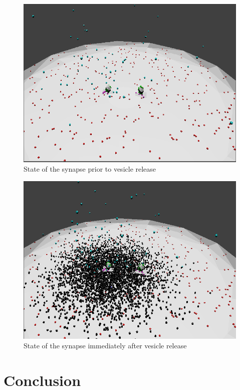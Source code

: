 \documentclass[a4paper]{article}
\begin{document}
\begin{figure}[H]
   \centering
   \includegraphics[scale = 0.4]{fig1.png} %
   \caption{State of the synapse prior to vesicle release}
   \label{fig1}
\end{figure}

\begin{figure}[H]
   \centering
   \includegraphics[scale = 0.4]{fig2.png} %
   \caption{State of the synapse immediately after vesicle release}
   \label{fig2}
\end{figure}


\section{Conclusion}
\end{document}
